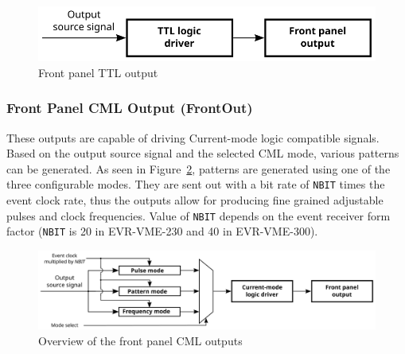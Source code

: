 \documentclass[12pt,a4paper]{article}
\begin{document}
\begin{figure}[H]
	\centering
	\includegraphics[]{./img/TTL}
	\caption{Front panel TTL output}
	\label{fig:output_ttl}
\end{figure}

\subsubsection{Front Panel CML Output (FrontOut)}\label{sec:Front Panel CML Output}
These outputs are capable of driving Current-mode logic compatible signals. Based on the output source signal and the selected CML mode, various patterns can be generated. As seen in Figure~\ref{fig:output_cml}, patterns are generated using one of the three configurable modes. They are sent out with a bit rate of \texttt{NBIT} times the event clock rate, thus the outputs allow for producing fine grained adjustable pulses and clock frequencies. Value of \texttt{NBIT} depends on the event receiver form factor (\texttt{NBIT} is 20 in EVR-VME-230 and 40 in EVR-VME-300).
\begin{figure}[H]
	\centering
	\includegraphics[width=\columnwidth]{./img/CML}
	\caption{Overview of the front panel CML outputs}
	\label{fig:output_cml}
\end{figure}
\end{document}
